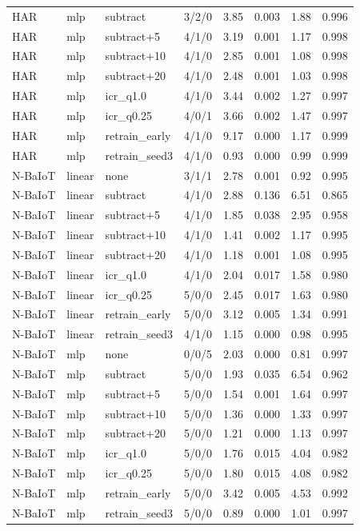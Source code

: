 \begin{table}[h]
\begin{tabular}{@{}lllcrrrr@{}}
HAR & mlp & subtract & 3/2/0 & 3.85 & 0.003 & 1.88 & 0.996 \\
HAR & mlp & subtract+5 & 4/1/0 & 3.19 & 0.001 & 1.17 & 0.998 \\
HAR & mlp & subtract+10 & 4/1/0 & 2.85 & 0.001 & 1.08 & 0.998 \\
HAR & mlp & subtract+20 & 4/1/0 & 2.48 & 0.001 & 1.03 & 0.998 \\
HAR & mlp & icr\_q1.0 & 4/1/0 & 3.44 & 0.002 & 1.27 & 0.997 \\
HAR & mlp & icr\_q0.25 & 4/0/1 & 3.66 & 0.002 & 1.47 & 0.997 \\
HAR & mlp & retrain\_early & 4/1/0 & 9.17 & 0.000 & 1.17 & 0.999 \\
HAR & mlp & retrain\_seed3 & 4/1/0 & 0.93 & 0.000 & 0.99 & 0.999 \\
N-BaIoT & linear & none & 3/1/1 & 2.78 & 0.001 & 0.92 & 0.995 \\
N-BaIoT & linear & subtract & 4/1/0 & 2.88 & 0.136 & 6.51 & 0.865 \\
N-BaIoT & linear & subtract+5 & 4/1/0 & 1.85 & 0.038 & 2.95 & 0.958 \\
N-BaIoT & linear & subtract+10 & 4/1/0 & 1.41 & 0.002 & 1.17 & 0.995 \\
N-BaIoT & linear & subtract+20 & 4/1/0 & 1.18 & 0.001 & 1.08 & 0.995 \\
N-BaIoT & linear & icr\_q1.0 & 4/1/0 & 2.04 & 0.017 & 1.58 & 0.980 \\
N-BaIoT & linear & icr\_q0.25 & 5/0/0 & 2.45 & 0.017 & 1.63 & 0.980 \\
N-BaIoT & linear & retrain\_early & 5/0/0 & 3.12 & 0.005 & 1.34 & 0.991 \\
N-BaIoT & linear & retrain\_seed3 & 4/1/0 & 1.15 & 0.000 & 0.98 & 0.995 \\
N-BaIoT & mlp & none & 0/0/5 & 2.03 & 0.000 & 0.81 & 0.997 \\
N-BaIoT & mlp & subtract & 5/0/0 & 1.93 & 0.035 & 6.54 & 0.962 \\
N-BaIoT & mlp & subtract+5 & 5/0/0 & 1.54 & 0.001 & 1.64 & 0.997 \\
N-BaIoT & mlp & subtract+10 & 5/0/0 & 1.36 & 0.000 & 1.33 & 0.997 \\
N-BaIoT & mlp & subtract+20 & 5/0/0 & 1.21 & 0.000 & 1.13 & 0.997 \\
N-BaIoT & mlp & icr\_q1.0 & 5/0/0 & 1.76 & 0.015 & 4.04 & 0.982 \\
N-BaIoT & mlp & icr\_q0.25 & 5/0/0 & 1.80 & 0.015 & 4.08 & 0.982 \\
N-BaIoT & mlp & retrain\_early & 5/0/0 & 3.42 & 0.005 & 4.53 & 0.992 \\
N-BaIoT & mlp & retrain\_seed3 & 5/0/0 & 0.89 & 0.000 & 1.01 & 0.997 \\
\bottomrule
\end{tabular}
\end{table}

